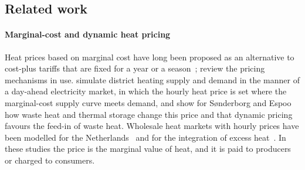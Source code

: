 \subsection{Related work}

\paragraph{Marginal-cost and dynamic heat pricing}
Heat prices based on marginal cost have long been proposed as an alternative to cost-plus tariffs that are fixed for a year or a season~\cite{sjoedin2004marginal,difs2009pricing,zhang2013equivalent,sun2016marginal}; \citet{li2015review} review the pricing mechanisms in use. \citet{dominkovic2018influence} simulate district heating supply and demand in the manner of a day-ahead electricity market, in which the hourly heat price is set where the marginal-cost supply curve meets demand, and show for Sønderborg and Espoo how waste heat and thermal storage change this price and that dynamic pricing favours the feed-in of waste heat. Wholesale heat markets with hourly prices have been modelled for the Netherlands~\cite{liu2019marginal} and for the integration of excess heat~\cite{doracic2021utilizing}. In these studies the price is the marginal value of heat, and it is paid to producers or charged to consumers.

